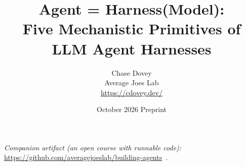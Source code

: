 \documentclass[11pt]{article}
\title{Agent = Harness(Model):\\Five Mechanistic Primitives of LLM Agent Harnesses}
\author{Chase Dovey\\Average Joes Lab\\\url{https://cdovey.dev/}}
\date{October 2026 \quad Preprint}
\begin{document}
\maketitle

\begin{abstract}

\end{abstract}

\noindent\textit{Companion artifact (an open course with runnable code):} \url{https://github.com/averagejoeslab/building-agents}~\cite{course}.






\appendix

\end{document}
